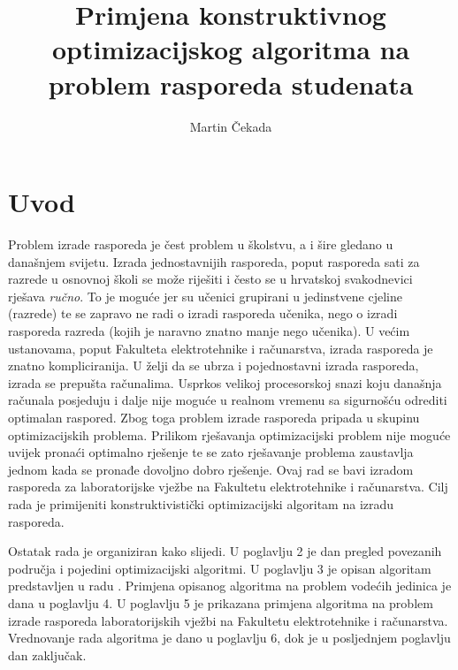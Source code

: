 \documentclass[times, utf8, zavrsni]{fer}
\begin{document}

\title{Primjena konstruktivnog optimizacijskog algoritma na problem
rasporeda studenata}

\author{Martin Čekada}

\maketitle




\tableofcontents

\chapter{Uvod}
Problem izrade rasporeda je čest problem u školstvu, a i šire gledano u današnjem svijetu. Izrada jednostavnijih rasporeda, poput
rasporeda sati za razrede u osnovnoj školi se može riješiti i često se u hrvatskoj svakodnevici rješava \textit{ručno}. To je moguće jer su učenici
grupirani u jedinstvene cjeline (razrede) te se zapravo ne radi o izradi rasporeda učenika, nego o izradi rasporeda razreda (kojih je naravno znatno manje nego učenika).
U većim ustanovama, poput Fakulteta elektrotehnike i računarstva, izrada rasporeda je znatno kompliciranija. U želji da se ubrza i pojednostavni izrada rasporeda,
izrada se prepušta računalima. Usprkos velikoj procesorskoj snazi koju današnja računala posjeduju i dalje nije moguće u realnom vremenu sa sigurnošću odrediti
optimalan raspored. Zbog toga problem izrade rasporeda pripada u skupinu optimizacijskih problema. Prilikom rješavanja optimizacijski problem nije moguće uvijek pronaći
optimalno rješenje te se zato rješavanje problema zaustavlja jednom kada se pronađe dovoljno dobro rješenje.
Ovaj rad se bavi izradom rasporeda za laboratorijske vježbe na Fakultetu elektrotehnike i računarstva. Cilj rada je
primijeniti konstruktivistički optimizacijski algoritam na izradu rasporeda.

Ostatak rada je organiziran kako slijedi. U poglavlju 2 je dan pregled povezanih područja i pojedini optimizacijski algoritmi. U poglavlju 3 je opisan algoritam
predstavljen u radu \cite{DBLP:journals/tec/WuK14}. Primjena opisanog algoritma na problem vodećih jedinica je dana u poglavlju 4. U poglavlju 5 je prikazana primjena
algoritma na problem izrade rasporeda laboratorijskih vježbi na Fakultetu elektrotehnike i računarstva. Vrednovanje rada algoritma je dano u poglavlju 6, dok je
u posljednjem poglavlju dan zaključak.
\end{document}
